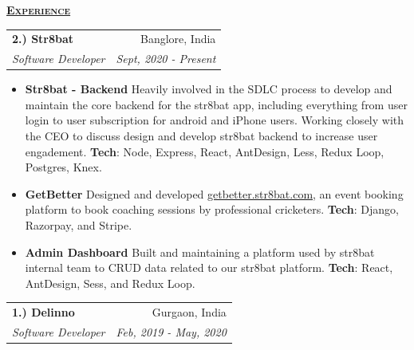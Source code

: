 \documentclass[11pt, a4paper]{article}
\begin{document}
\setlength\tabcolsep{0pt}
\begin{flushleft}
    \uline{\textsc{\large{\textbf{Experience}}}\hfill}
    \newline
    \newline
\setlength\tabcolsep{0pt}
\begin{tabularx}{\textwidth}{X r}
    \large{\textbf{2.) Str8bat}} & Banglore, India\\
    \textit{Software Developer} & \textit {Sept, 2020 - Present}\\
\end{tabularx}
\begin{itemize}
    \textbf{Str8bat uses IoT based technology that gives real-time actionable insights to budding and professional cricket batters.
    }

    \textbf{Responsible}
    for the whole backend development, related integration with other platforms like SendGrid, MSG91, google, and apple for subscription-related things, mentoring juniors, interns, and everything else that comes with working in a small team startup.

    \item {\bf{Str8bat - Backend}}
    \newline
    Heavily involved in the SDLC process to develop and maintain the core backend for the str8bat app, including everything from user login to user subscription for android and iPhone users.
    Working closely with the CEO to discuss design and develop str8bat backend to increase user engadement. 
    \newline
    \textbf{Tech}: Node, Express, React, AntDesign, Less, Redux Loop, Postgres, Knex. 
    \item {\bf{GetBetter}}
    \newline
    Designed and developed \href{https://getbetter.str8bat.com}{getbetter.str8bat.com}, an event booking platform to book coaching sessions by professional cricketers.
    \newline
    \textbf{Tech}: Django, Razorpay, and Stripe.
    \item {\bf{Admin Dashboard}}
    \newline
    Built and maintaining a platform used by str8bat internal team to CRUD data related to our str8bat platform.
    \newline
    \textbf{Tech}: React, AntDesign, Sess, and Redux Loop. 

\end{itemize}

    \begin{tabularx}{\textwidth}{X r}
        \large{\textbf{1.) Delinno}} & Gurgaon, India\\
        \textit{Software Developer}  & \textit {Feb, 2019 - May, 2020}\\
    \end{tabularx}
\end{flushleft}
\end{document}
